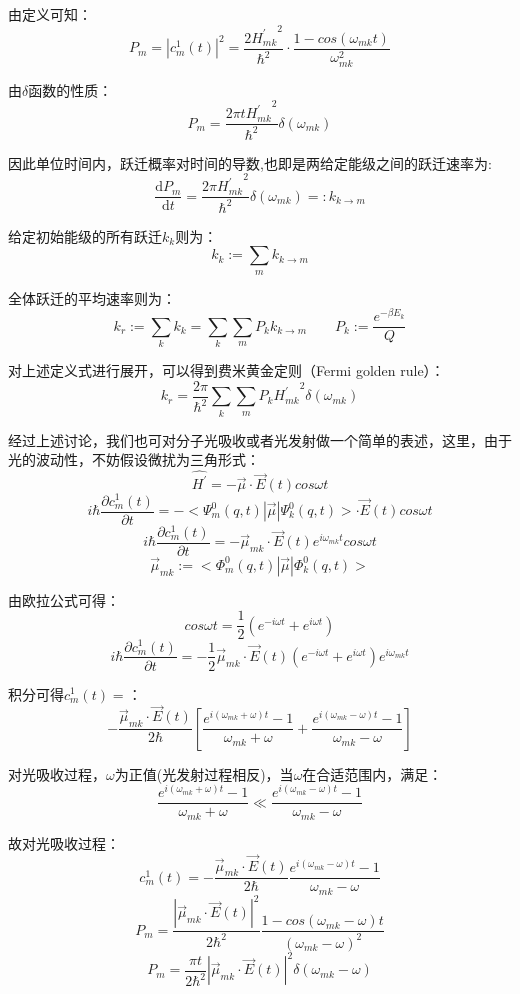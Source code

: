 由定义可知：
\[P_m=|c_m^1(t)|^2=\frac{2{H^{'}_{mk}}^2}{\hbar^2 } \cdot \frac{1-cos(\omega_{mk}t)}{\omega_{mk}^2}\]

由$\delta$函数的性质：
\[P_m=\frac{2 \pi t{H^{'}_{mk}}^2}{\hbar^2 }\delta(\omega_{mk})\]

因此单位时间内，跃迁概率对时间的导数,也即是两给定能级之间的跃迁速率为:
\[\frac{\mathrm{d} P_m}{\mathrm{d} t}=\frac{2 \pi {H^{'}_{mk}}^2}{\hbar^2 }\delta(\omega_{mk})=:k_{k \rightarrow m}\]

给定初始能级的所有跃迁$k_{k}$则为：
\[k_{k}:=\sum_mk_{k \rightarrow m}\]

全体跃迁的平均速率则为：
\[k_r:=\sum_kk_{k}=\sum_k\sum_m P_k k_{k \rightarrow m} \qquad P_k:=\frac{e^{-\beta E_k}}{Q}\]

对上述定义式进行展开，可以得到费米黄金定则（Fermi golden rule）：
\[k_r=\frac{2 \pi}{\hbar^2}\sum_k\sum_m P_k {H^{'}_{mk}}^2\delta(\omega_{mk})\]

经过上述讨论，我们也可对分子光吸收或者光发射做一个简单的表述，这里，由于光的波动性，不妨假设微扰为三角形式：
\[\hat{H^{'}}=-\overrightarrow{\mu} \cdot \overrightarrow{E}(t)cos\omega t\]
\[i \hbar \frac{\partial c_m^1(t)}{\partial t}=-<\varPsi_m^0(q,t)|\overrightarrow{\mu}|\varPsi_k^0(q,t)>\cdot \overrightarrow{E}(t)cos\omega t\]
\[i \hbar \frac{\partial c_m^1(t)}{\partial t}=-\overrightarrow{\mu}_{mk} \cdot \overrightarrow{E}(t) e^{i \omega_{mk}t}cos\omega t\]
\[\overrightarrow{\mu}_{mk}:=<\varPhi_m^0(q,t)|\overrightarrow{\mu}|\varPhi_k^0(q,t)>\]

由欧拉公式可得：
\[cos\omega t=\frac{1}{2}(e^{-i\omega t}+e^{i \omega t})\]
\[i \hbar \frac{\partial c_m^1(t)}{\partial t}=-\frac{1}{2}\overrightarrow{\mu}_{mk} \cdot \overrightarrow{E}(t)(e^{-i\omega t}+e^{i \omega t}) e^{i \omega_{mk}t}\]

积分可得$c_m^1(t)=$：
\[-\frac{\overrightarrow{\mu}_{mk} \cdot \overrightarrow{E}(t)}{2 \hbar}\left [\frac{e^{i(\omega_{mk}+\omega)t}-1}{\omega_{mk}+\omega}+\frac{e^{i(\omega_{mk}-\omega)t}-1}{\omega_{mk}-\omega} \right ]\]

对光吸收过程，$\omega$为正值(光发射过程相反)，当$\omega$在合适范围内，满足：
\[\frac{e^{i(\omega_{mk}+\omega)t}-1}{\omega_{mk} + \omega} \ll \frac{e^{i(\omega_{mk}-\omega)t}-1}{\omega_{mk}-\omega}\]

故对光吸收过程：
\[c_m^1(t)=-\frac{\overrightarrow{\mu}_{mk} \cdot \overrightarrow{E}(t)}{2 \hbar}\frac{e^{i(\omega_{mk}-\omega)t}-1}{\omega_{mk}-\omega}\]
\[P_m=\frac{|\overrightarrow{\mu}_{mk} \cdot \overrightarrow{E}(t)|^2}{2 \hbar^2}\frac{1-cos(\omega_{mk}-\omega)t}{(\omega_{mk}-\omega)^2}\]
\[P_m=\frac{\pi t}{2 \hbar^2}|\overrightarrow{\mu}_{mk} \cdot \overrightarrow{E}(t)|^2 \delta(\omega_{mk}-\omega)\]

